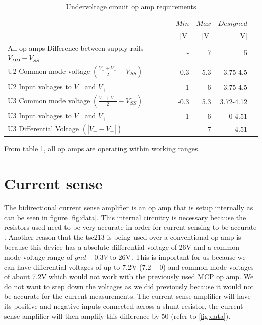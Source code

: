\begin{table}[!htb]
	\centering
	\footnotesize
	\caption[Undervoltage circuit op amp requirements]{Undervoltage circuit op amp requirements \cite{MCP}}
	\begin{tabular}{lrrrr}
		\toprule
		& $Min$ &$Max$&$Designed$\\
		&[V]&[V]&[V]\\
		\midrule
		All op amps Difference between supply rails $V_{DD} - V_{SS}$ & -& 7  &5   \\
		U2 Common mode voltage $(\frac{V_+ + V_-}{2}-V_{SS})$ &  -0.3&5.3&3.75-4.5\\
		U2 Input voltages to $V_-$ and  $V_+$   &  -1    &6& 3.75-4.5 \\
		
		
		U3 Common mode voltage $(\frac{V_+ + V_-}{2}-V_{SS})$ &  -0.3&5.3&3.72-4.12\\
		U3 Input voltages to $V_-$ and $V_+$  &  -1    &6&0-4.51 \\
		U3 Differential Voltage $ (|V_+ - V_-|)$ & -& 7& 4.51   \\
		
		\bottomrule
	\end{tabular}
	\label{tab:MCPunder}
\end{table}

From table \ref{tab:MCPunder}, all op amps are operating within working ranges.


\newpage
\section{Current sense}
The bidirectional current sense amplifier is an op amp that is setup internally as can be seen in figure \ref{fig:data}. This internal circuitry is necessary because the resistors used need to be very accurate in order for current sensing to be accurate \cite{utube}. Another reason that the tsc213 is being used over a conventional op amp is because this device has a absolute differential voltage of 26V and a common mode voltage range of $gnd-0.3V$ to 26V. This is important for us because we can have differential voltages of up to 7.2V ($7.2-0$) and common mode voltages of about 7.2V which would not work with the previously used MCP op amp. We do not want to step down the voltages as we did previously because it would not be accurate for the current measurements. The current sense amplifier will have its positive and negative inputs connected across a shunt resistor, the current sense amplifier will then amplify this difference by 50 (refer to \ref{fig:data}).




